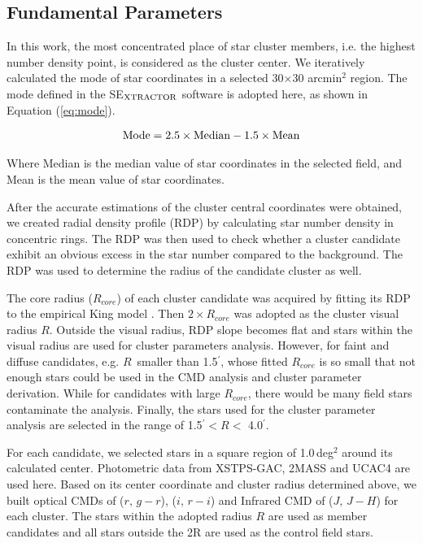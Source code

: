 \documentclass[]{raa_rb}
\begin{document}
\subsection{Fundamental Parameters}
In this work, the most concentrated place of star cluster members, i.e. the highest number density point, is considered as the cluster center. We iteratively calculated the mode of star coordinates in a selected 30$\times$30 arcmin$^{2}$ region. The mode defined in the SE$_{\rm XTRACTOR}$ software \citep{Bertin1996} is adopted here, as shown in Equation (\ref{eq:mode}).

\begin{equation}
\label{eq:mode}
\begin{aligned}
\rm Mode = 2.5 \times \rm Median - 1.5 \times \rm Mean \\
\end{aligned} 
\end{equation}

Where Median is the median value of star coordinates in the selected field, and Mean is the mean value of star coordinates.

  After the accurate estimations of the cluster central coordinates were obtained, we created radial density profile (RDP) by calculating star number density in concentric rings. The RDP was then used to check whether a cluster candidate exhibit an obvious excess in the star number compared to the background. The RDP was used to determine the radius of the candidate cluster as well. 

The core radius ($R_{core}$) of each cluster candidate was acquired by fitting its RDP to the empirical King model \citep{King1962}. Then $2\times R_{core}$ was adopted as the cluster visual radius $R$. Outside the visual radius, RDP slope becomes flat and stars within the visual radius are used for cluster parameters analysis. 
However, for faint and diffuse candidates, e.g. $R$~smaller than 1.5$^{'}$, whose fitted $R_{core}$ is so small that not enough stars could be used in the CMD analysis and cluster parameter derivation. While for candidates with large $R_{core}$, there would be many field stars contaminate the analysis. Finally, the stars used for the cluster parameter analysis are selected in the range of 1.5$^{'} < R <$ 4.0$^{'}$. 




For each candidate, we selected stars in a square region of 1.0\,deg$^{2}$ around its calculated center. Photometric data from XSTPS-GAC, 2MASS and UCAC4 are used here.  Based on its center coordinate and cluster radius determined above, we built optical CMDs of ($r,\,g-r$), ($i,\,r-i$) and  Infrared CMD of ($J,\,J-H$) for each cluster. The stars within the adopted radius $R$ are used as member candidates and  all stars outside the 2R are used as the control field stars. 
\end{document}
